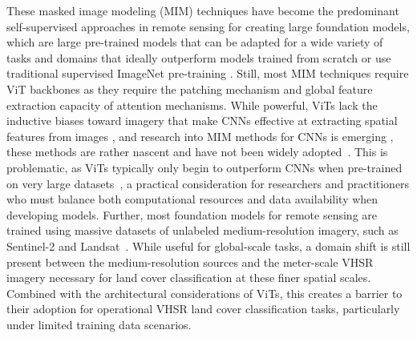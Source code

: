 These masked image modeling (MIM) techniques have become the predominant self-supervised approaches in remote sensing for creating large foundation models, which are large pre-trained models that can be adapted for a wide variety of tasks and domains that ideally outperform models trained from scratch or use traditional supervised ImageNet pre-training \citep{sunRingMoRemoteSensing2023, jakubikFoundationModelsGeneralist2023, szwarcmanPrithviEO20VersatileMultiTemporal2025}.
Still, most MIM techniques require ViT backbones as they require the patching mechanism and global feature extraction capacity of attention mechanisms.
While powerful, ViTs lack the inductive biases toward imagery that make CNNs effective at extracting spatial features from images \citep{adadiSurveyDataefficientAlgorithms2021}, and research into MIM methods for CNNs is emerging \citep{liArchitectureAgnosticMaskedImage2023,tianDesigningBERTConvolutional2023, wooConvNeXtV2CoDesigning2023}, these methods are rather nascent and have not been widely adopted~\citep{hondruMaskedImageModeling2025}.
This is problematic, as ViTs typically only begin to outperform CNNs when pre-trained on very large datasets~\citep{dosovitskiyImageWorth16x162020}, a practical consideration for researchers and practitioners who must balance both computational resources and data availability when developing models.
Further, most foundation models for remote sensing are trained using massive datasets of unlabeled medium-resolution imagery, such as Sentinel-2 and Landsat~\citep{luVisionFoundationModels2025}.
While useful for global-scale tasks, a domain shift is still present between the medium-resolution sources and the meter-scale VHSR imagery necessary for land cover classification at these finer spatial scales.
Combined with the architectural considerations of ViTs, this creates a barrier to their adoption for operational VHSR land cover classification tasks, particularly under limited training data scenarios.

